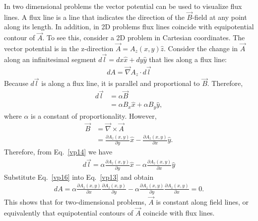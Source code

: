 \documentclass[12pt,a4paper,oneside]{book}
\begin{document}
\begin{onehalfspace}
In two dimensional problems the vector potential can be used to visualize flux lines. A flux line is a line that indicates the direction of the $\vec{B}$-field at any point along its length. In addition, in 2D problems flux lines coincide with equipotential contour of $\vec{A}$. To see this, consider a 2D problem in Cartesian coordinates. The vector potential is in the z-direction $\vec{A}=A_z(x,y)\hat{z}$. Consider the change in $\vec{A}$ along an infinitesimal segment $d\vec{l}=dx\hat{x}+dy\hat{y}$ that lies along a flux line:
\begin{equation}\label{vp13}
	\begin{aligned}
		dA = \vec{\nabla}A_z\cdot d\vec{l}
	\end{aligned}
\end{equation}
Because $d\vec{l}$ is along a flux line, it is parallel and proportional to $\vec{B}$. Therefore,
\begin{equation}\label{vp14}
	\begin{aligned}
		d\vec{l} &=\alpha\vec{B} \\[6pt]
		&=\alpha B_x \hat{x} + \alpha B_y \hat{y},
	\end{aligned}
\end{equation}
where $\alpha$ is a constant of proportionality. However, 
\begin{equation}\label{vp15}
	\begin{aligned}
		\vec{B} &= \vec{\nabla}\times\vec{A} \\[6pt]
		&= \frac{\partial A_z(x,y)}{\partial y} \hat{x} - \frac{\partial A_z(x,y)}{\partial x}\hat{y}.
	\end{aligned}
\end{equation}
Therefore, from Eq.~\eqref{vp14} we have
\begin{equation}\label{vp16}
	\begin{aligned}
		d\vec{l} = \alpha\frac{\partial A_z(x,y)}{\partial y}\hat{x}-\alpha\frac{\partial A_z(x,y)}{\partial x}\hat{y}
	\end{aligned}
\end{equation}
Substitute Eq.~\eqref{vp16} into Eq.~\eqref{vp13} and obtain 
\begin{equation}\label{vp17}
	\begin{aligned}
dA = \alpha \frac{\partial A_z(x,y)}{\partial x}\frac{\partial A_z(x,y)}{\partial y} - \alpha \frac{\partial A_z(x,y)}{\partial y}\frac{\partial A_z(x,y)}{\partial x} = 0.
	\end{aligned}
\end{equation}
This shows that for two-dimensional problems, $\vec{A}$ is constant along field lines, or equivalently that equipotential contours of $\vec{A}$ coincide with flux lines.


\end{onehalfspace}
\end{document}
